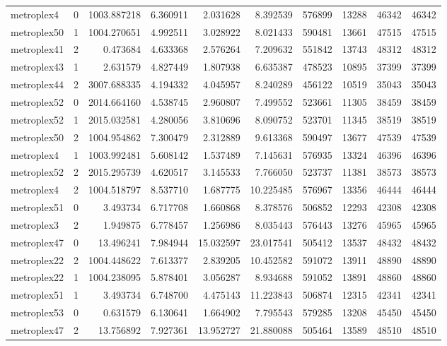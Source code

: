 \begin{longtable}{|l|r|r|r|r|r|r|r|r|r|}
metroplex4 & 0 & 1003.887218 & 6.360911 & 2.031628 & 8.392539 & 576899 & 13288 & 46342 & 46342 \\
metroplex50 & 1 & 1004.270651 & 4.992511 & 3.028922 & 8.021433 & 590481 & 13661 & 47515 & 47515 \\
metroplex41 & 2 & 0.473684 & 4.633368 & 2.576264 & 7.209632 & 551842 & 13743 & 48312 & 48312 \\
metroplex43 & 1 & 2.631579 & 4.827449 & 1.807938 & 6.635387 & 478523 & 10895 & 37399 & 37399 \\
metroplex44 & 2 & 3007.688335 & 4.194332 & 4.045957 & 8.240289 & 456122 & 10519 & 35043 & 35043 \\
metroplex52 & 0 & 2014.664160 & 4.538745 & 2.960807 & 7.499552 & 523661 & 11305 & 38459 & 38459 \\
metroplex52 & 1 & 2015.032581 & 4.280056 & 3.810696 & 8.090752 & 523701 & 11345 & 38519 & 38519 \\
metroplex50 & 2 & 1004.954862 & 7.300479 & 2.312889 & 9.613368 & 590497 & 13677 & 47539 & 47539 \\
metroplex4 & 1 & 1003.992481 & 5.608142 & 1.537489 & 7.145631 & 576935 & 13324 & 46396 & 46396 \\
metroplex52 & 2 & 2015.295739 & 4.620517 & 3.145533 & 7.766050 & 523737 & 11381 & 38573 & 38573 \\
metroplex4 & 2 & 1004.518797 & 8.537710 & 1.687775 & 10.225485 & 576967 & 13356 & 46444 & 46444 \\
metroplex51 & 0 & 3.493734 & 6.717708 & 1.660868 & 8.378576 & 506852 & 12293 & 42308 & 42308 \\
metroplex3 & 2 & 1.949875 & 6.778457 & 1.256986 & 8.035443 & 576443 & 13276 & 45965 & 45965 \\
metroplex47 & 0 & 13.496241 & 7.984944 & 15.032597 & 23.017541 & 505412 & 13537 & 48432 & 48432 \\
metroplex22 & 2 & 1004.448622 & 7.613377 & 2.839205 & 10.452582 & 591072 & 13911 & 48890 & 48890 \\
metroplex22 & 1 & 1004.238095 & 5.878401 & 3.056287 & 8.934688 & 591052 & 13891 & 48860 & 48860 \\
metroplex51 & 1 & 3.493734 & 6.748700 & 4.475143 & 11.223843 & 506874 & 12315 & 42341 & 42341 \\
metroplex53 & 0 & 0.631579 & 6.130641 & 1.664902 & 7.795543 & 579285 & 13208 & 45450 & 45450 \\
metroplex47 & 2 & 13.756892 & 7.927361 & 13.952727 & 21.880088 & 505464 & 13589 & 48510 & 48510 \\

\end{longtable}
